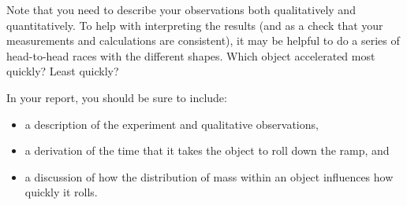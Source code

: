 \documentclass[11pt,letterpaper]{article}
\begin{document}
Note that you need to describe your observations both qualitatively and quantitatively. To help with interpreting the results (and as a check that your measurements and calculations are consistent), it may be helpful to do a series of head-to-head races with the different shapes. Which object accelerated most quickly? Least quickly?

In your report, you should be sure to include:
\begin{itemize}
\item a description of the experiment and qualitative observations,
\item a derivation of the time that it takes the object to roll down the ramp, and
\item a discussion of how the distribution of mass within an object influences how quickly it rolls.
\end{itemize}
\end{document}
